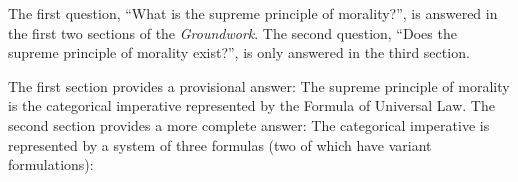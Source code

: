 The first question, ``What is the supreme principle of morality?'', is answered in the first two sections of the \emph{Groundwork}. The second question, ``Does the supreme principle of morality exist?'', is only answered in the third section.

% 


The first section provides a provisional answer: The supreme principle of morality is the categorical imperative represented by the Formula of Universal Law. The second section provides a more complete answer: The categorical imperative is represented by a system of three formulas (two of which have variant formulations):\\

